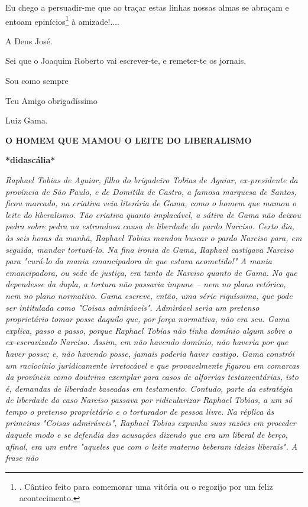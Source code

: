 Eu chego a persuadir-me que ao traçar estas linhas nossas almas se
abraçam e entoam epinícios\footnote{. Cântico feito para comemorar uma
  vitória ou o regozijo por um feliz acontecimento.} à amizade!....

A Deus José.

Sei que o Joaquim Roberto vai escrever-te, e remeter-te os jornais.

Sou como sempre

Teu Amigo obrigadíssimo

Luiz Gama.

\textbf{O HOMEM QUE MAMOU O LEITE DO LIBERALISMO}

\textbf{*didascália*}

\emph{Raphael Tobias de Aguiar, filho do brigadeiro Tobias de Aguiar,
ex-presidente da província de São Paulo, e de Domitila de Castro, a
famosa marquesa de Santos, ficou marcado, na criativa veia literária de
Gama, como o homem que mamou o leite do liberalismo. Tão criativa quanto
implacável, a sátira de Gama não deixou pedra sobre pedra na estrondosa
causa de liberdade do pardo Narciso. Certo dia, às seis horas da manhã,
Raphael Tobias mandou buscar o pardo Narciso para, em seguida, mandar
torturá-lo. Na fina ironia de Gama, Raphael castigava Narciso para
"curá-lo da mania emancipadora de que estava acometido!" A mania
emancipadora, ou sede de justiça, era tanto de Narciso quanto de Gama.
No que dependesse da dupla, a tortura não passaria impune -- nem no
plano retórico, nem no plano normativo. Gama escreve, então, uma série
riquíssima, que pode ser intitulada como "Coisas admiráveis". Admirável
seria um pretenso proprietário tomar posse daquilo que, por força
normativa, não era seu. Gama explica, passo a passo, porque Raphael
Tobias não tinha domínio algum sobre o ex-escravizado Narciso. Assim, em
não havendo domínio, não haveria por que haver posse; e, não havendo
posse, jamais poderia haver castigo. Gama constrói um raciocínio
juridicamente irretocável e que provavelmente figurou em comarcas da
província como doutrina exemplar para casos de alforrias testamentárias,
isto é, demandas de liberdade baseadas em testamento. Contudo, parte da
estratégia de liberdade do caso Narciso passava por ridicularizar
Raphael Tobias, a um só tempo o pretenso proprietário e o torturador de
pessoa livre. Na réplica às primeiras "Coisas admiráveis", Raphael
Tobias expunha suas razões em proceder daquele modo e se defendia das
acusações dizendo que era um liberal de berço, afinal, era um entre
"aqueles que com o leite materno beberam ideias liberais". A frase não
}
